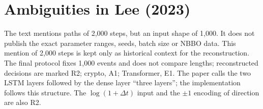\chapter{Ambiguities in Lee (2023)}
\label{ap:lee}

The text mentions paths of 2,000 steps, but an input shape of 1,000. It does not
publish the exact parameter ranges, seeds, batch size or NBBO data. This mention of
2,000 steps is kept only as historical context for the reconstruction. The final
protocol fixes 1,000 events and does not compare lengths; reconstructed decisions are
marked R2; crypto, A1; Transformer, E1. The paper calls the two LSTM layers followed
by the dense layer ``three layers''; the implementation follows this structure. The
\(\log(1+\Delta t)\) input and the \(\pm1\) encoding of direction are also R2.
